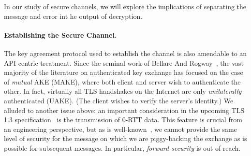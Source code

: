 \begin{task}\label{task:sc}
  In our study of secure channels, we will explore the implications of
  separating the message and error int he output of decryption.
\end{task}

\fi
%

\paragraph{Establishing the Secure Channel. }
The key agreement protocol used to establish the channel is also amendable to an
API-centric treatment.
%
Since the seminal work of Bellare And Rogway~\cite{BR93}, the vast majority of
the literature on authenticated key exchange has focused on the case of
\emph{mutual} AKE (MAKE), where both client and server wish to authenticate the
other. In fact, virtually all TLS handshakes on the Internet are only
\emph{unilaterally} authenticated (UAKE). (The client wishes to verify the
server's identity.)
%
\fi
%
We alluded to another issue above: an important consideration in the upcoming TLS 1.3
specification~\cite{tls13} is the transmission of 0-RTT data.
%
This feature is crucial from an engineering perspective, but as is
well-known~\cite[Section 2.2]{tls13}, we cannot provide the same level of
security for the message on which we are piggy-backing the exchange as is
possible for subsequent messages. In particular, \emph{forward security} is out
of reach.


